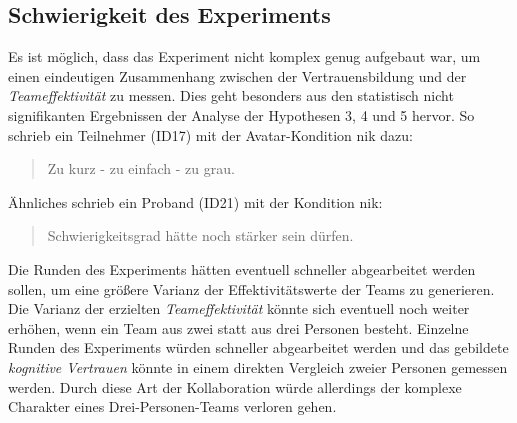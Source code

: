 \documentclass[a4paper,11pt]{article}%
\renewcommand{\\}{\vspace*{0.5\baselineskip} \newline}
\begin{document}
{{\subsection{Schwierigkeit des Experiments}
\label{Schwierigkeit des Experiments}

Es ist möglich, dass das Experiment nicht komplex genug aufgebaut war, um einen eindeutigen Zusammenhang zwischen der Vertrauensbildung und der \textit{Teameffektivität} zu messen. Dies geht besonders aus den statistisch nicht signifikanten Ergebnissen der Analyse der Hypothesen 3, 4 und 5 hervor. So schrieb ein Teilnehmer (ID17) mit der Avatar-Kondition \ac{nik} dazu:
\begin{quote}
\glqq{}Zu kurz - zu einfach - zu grau.\dq{}
\end{quote}
Ähnliches schrieb ein Proband (ID21) mit der Kondition \ac{nik}:
\begin{quote}
\glqq{}Schwierigkeitsgrad hätte noch stärker sein dürfen.\dq{}
\end{quote}
Die Runden des Experiments hätten eventuell schneller abgearbeitet werden sollen, um eine größere Varianz der Effektivitätswerte der Teams zu generieren. Die Varianz der erzielten \textit{Teameffektivität} könnte sich eventuell noch weiter erhöhen, wenn ein Team aus zwei statt aus drei Personen besteht. Einzelne Runden des Experiments würden schneller abgearbeitet werden und das gebildete \textit{kognitive Vertrauen} könnte in einem direkten Vergleich zweier Personen gemessen werden. Durch diese Art der Kollaboration würde allerdings der komplexe Charakter eines Drei-Personen-Teams verloren gehen.

}}
\end{document}
